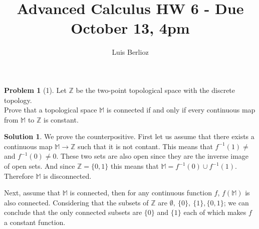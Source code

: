 \documentclass{article}
\theoremstyle{definition}
\newtheorem*{soln}{Solution}
\newtheorem*{prob}{Problem}
\theoremstyle{theorem}
\newcommand{\Z}{\mathbb{Z}}
\newcommand{\M}{\mathbb{M}}
\newcommand{\E}{\mathbb{\emptyset}}
\begin{document}
\title{Advanced Calculus HW 6 - Due October 13, 4pm}
\author{Luis Berlioz}
\maketitle



\begin{prob}[1]
Let $\mathbb{Z}$ be the two-point topological space with the discrete topology.  \\Prove that a topological space $\mathbb{M}$ is connected if and only if every continuous map from $\mathbb{M}$ to $\mathbb{Z}$ is constant.
\end{prob}
\begin{soln}
    We prove the counterpositive. First let us assume that there exists a continuous map $\M \to \Z$ such that it is not contant. This means that $f^{-1}(1)\neq$ and $f^{-1}(0) \neq 0$. These two sets are also open since they are the inverse image of open sets. And since $\Z = \{ 0, 1\}$ this means that $\M =  f^{-1}(0)\cup f^{-1}(1)  $. Therefore $\M$ is disconnected. 

    Next, assume that $\M$ is connected, then for any continuous function $f$, $f(\M)$ is also connected. Considering that the subsets of $\Z$ are $\E,\ \{0\},\ \{1\}, \{0,1\}$; we can conclude that the only connected subsets are $\{0\}$ and $\{1\}$ each of which makes $f$ a constant function.
\end{soln}
\vspace{1in}
\end{document}
